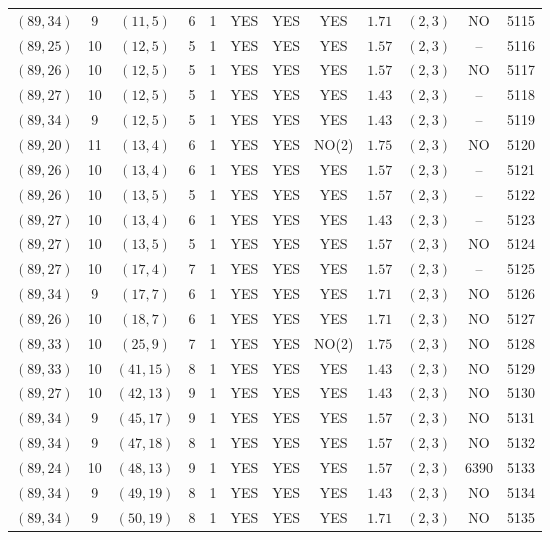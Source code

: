 \begin{longtable}{|c|c|c|c|c|c|c|c|c|c|c|c|}
$(89,34)$ & 9 & $(11,5)$ & 6 & 1 & YES & YES & YES & $1.71$ & $(2,3)$ & NO & 5115\\
$(89,25)$ & 10 & $(12,5)$ & 5 & 1 & YES & YES & YES & $1.57$ & $(2,3)$ & -- & 5116\\
$(89,26)$ & 10 & $(12,5)$ & 5 & 1 & YES & YES & YES & $1.57$ & $(2,3)$ & NO & 5117\\
$(89,27)$ & 10 & $(12,5)$ & 5 & 1 & YES & YES & YES & $1.43$ & $(2,3)$ & -- & 5118\\
$(89,34)$ & 9 & $(12,5)$ & 5 & 1 & YES & YES & YES & $1.43$ & $(2,3)$ & -- & 5119\\
$(89,20)$ & 11 & $(13,4)$ & 6 & 1 & YES & YES & NO(2) & $1.75$ & $(2,3)$ & NO & 5120\\
$(89,26)$ & 10 & $(13,4)$ & 6 & 1 & YES & YES & YES & $1.57$ & $(2,3)$ & -- & 5121\\
$(89,26)$ & 10 & $(13,5)$ & 5 & 1 & YES & YES & YES & $1.57$ & $(2,3)$ & -- & 5122\\
$(89,27)$ & 10 & $(13,4)$ & 6 & 1 & YES & YES & YES & $1.43$ & $(2,3)$ & -- & 5123\\
$(89,27)$ & 10 & $(13,5)$ & 5 & 1 & YES & YES & YES & $1.57$ & $(2,3)$ & NO & 5124\\
$(89,27)$ & 10 & $(17,4)$ & 7 & 1 & YES & YES & YES & $1.57$ & $(2,3)$ & -- & 5125\\
$(89,34)$ & 9 & $(17,7)$ & 6 & 1 & YES & YES & YES & $1.71$ & $(2,3)$ & NO & 5126\\
$(89,26)$ & 10 & $(18,7)$ & 6 & 1 & YES & YES & YES & $1.71$ & $(2,3)$ & NO & 5127\\
$(89,33)$ & 10 & $(25,9)$ & 7 & 1 & YES & YES & NO(2) & $1.75$ & $(2,3)$ & NO & 5128\\
$(89,33)$ & 10 & $(41,15)$ & 8 & 1 & YES & YES & YES & $1.43$ & $(2,3)$ & NO & 5129\\
$(89,27)$ & 10 & $(42,13)$ & 9 & 1 & YES & YES & YES & $1.43$ & $(2,3)$ & NO & 5130\\
$(89,34)$ & 9 & $(45,17)$ & 9 & 1 & YES & YES & YES & $1.57$ & $(2,3)$ & NO & 5131\\
$(89,34)$ & 9 & $(47,18)$ & 8 & 1 & YES & YES & YES & $1.57$ & $(2,3)$ & NO & 5132\\
$(89,24)$ & 10 & $(48,13)$ & 9 & 1 & YES & YES & YES & $1.57$ & $(2,3)$ & 6390 & 5133\\
$(89,34)$ & 9 & $(49,19)$ & 8 & 1 & YES & YES & YES & $1.43$ & $(2,3)$ & NO & 5134\\
$(89,34)$ & 9 & $(50,19)$ & 8 & 1 & YES & YES & YES & $1.71$ & $(2,3)$ & NO & 5135\\

\end{longtable}
